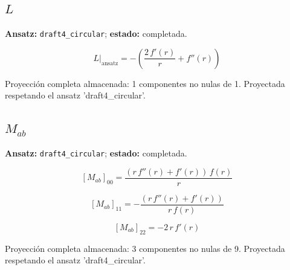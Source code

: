 \documentclass[11pt]{article}
\begin{document}
\subsection*{$ L $}
\textbf{Ansatz:} \texttt{draft4\_circular}; \textbf{estado:} completada.\par
\begin{dmath*}[breakdepth={5}]
L\big|_{\mathrm{ansatz}} = -\left(\frac{2\,f'\!\left(r\right)}{r} + f''\!\left(r\right)\right)
\end{dmath*}
\par\smallskip
Proyección completa almacenada: 1 componentes no nulas de 1. Proyectada respetando el ansatz 'draft4\_circular'.\par\medskip
{}
\subsection*{$ M_{ab} $}
\textbf{Ansatz:} \texttt{draft4\_circular}; \textbf{estado:} completada.\par
\begin{dmath*}[breakdepth={5}]
\left[M_{ab}\right]_{00} = \frac{\left(r\,f''\!\left(r\right) + f'\!\left(r\right)\right)\,f\!\left(r\right)}{r}
\end{dmath*}
\par\smallskip
\begin{dmath*}[breakdepth={5}]
\left[M_{ab}\right]_{11} = -\frac{\left(r\,f''\!\left(r\right) + f'\!\left(r\right)\right)}{r\,f\!\left(r\right)}
\end{dmath*}
\par\smallskip
\begin{dmath*}[breakdepth={5}]
\left[M_{ab}\right]_{22} = -2\,r\,f'\!\left(r\right)
\end{dmath*}
\par\smallskip
Proyección completa almacenada: 3 componentes no nulas de 9. Proyectada respetando el ansatz 'draft4\_circular'.\par\medskip
{}
\end{document}
